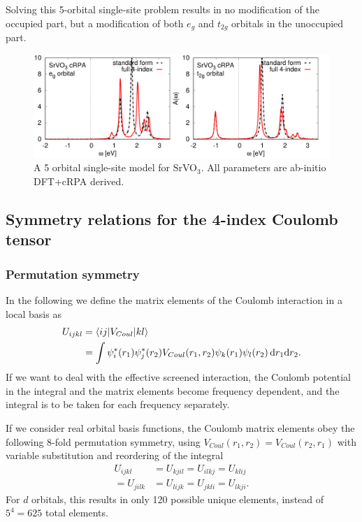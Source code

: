 \documentclass[12pt,a4paper]{scrartcl}
\numberwithin{equation}{section}
\begin{document}
Solving this 5-orbital single-site problem results in no modification of the occupied part, but a modification
of both $e_g$ and $t_{2g}$ orbitals in the unoccupied part.
\begin{figure}[h]
 \includegraphics[width=1.0\textwidth]{figs/nonHund/svo.pdf}
 \caption{A 5 orbital single-site model for SrVO$_3$. All parameters are ab-initio DFT+cRPA derived.}
\end{figure}

\clearpage

\subsection{Symmetry relations for the 4-index Coulomb tensor}
\subsubsection{Permutation symmetry}
In the following we define the matrix elements of the Coulomb interaction in a local basis as
\begin{align}
 U_{ijkl} 
 &= \braket{ij|V_{Coul}|kl} \nonumber \\
 &=\int \psi^*_i(r_1) \psi^*_j(r_2) V_{Coul}(r_1,r_2) \psi_k(r_1) \psi_l(r_2) \, \mathrm{d}r_1\mathrm{d}r_2.
\end{align}
If we want to deal with the effective screened interaction, the Coulomb potential in the integral and the matrix elements
become frequency dependent, and the integral is to be taken for each frequency separately.

If we consider real orbital basis functions, the Coulomb matrix elements obey the following 8-fold permutation symmetry,
using $V_{Coul}(r_1,r_2)=V_{Coul}(r_2,r_1)$ with variable substitution and reordering of the integral
\begin{align}
 U_{ijkl}
 &=U_{kjil} 
 =U_{ilkj} 
 =U_{klij} \nonumber \\
 =U_{jilk} 
 &=U_{lijk}
 =U_{jkli} 
 =U_{lkji} .
\end{align}
For $d$ orbitals, this results in only 120 possible unique elements, instead of $5^4=625$ total elements.
\end{document}
